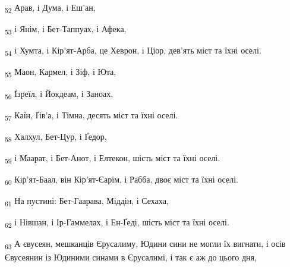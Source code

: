 \begin{tcolorbox}
\textsubscript{52} Арав, і Дума, і Еш'ан,
\end{tcolorbox}
\begin{tcolorbox}
\textsubscript{53} і Янім, і Бет-Таппуах, і Афека,
\end{tcolorbox}
\begin{tcolorbox}
\textsubscript{54} і Хумта, і Кір'ят-Арба, це Хеврон, і Ціор, дев'ять міст та їхні оселі.
\end{tcolorbox}
\begin{tcolorbox}
\textsubscript{55} Маон, Кармел, і Зіф, і Юта,
\end{tcolorbox}
\begin{tcolorbox}
\textsubscript{56} Їзреїл, і Йокдеам, і Заноах,
\end{tcolorbox}
\begin{tcolorbox}
\textsubscript{57} Каїн, Ґів'а, і Тімна, десять міст та їхні оселі.
\end{tcolorbox}
\begin{tcolorbox}
\textsubscript{58} Халхул, Бет-Цур, і Ґедор,
\end{tcolorbox}
\begin{tcolorbox}
\textsubscript{59} і Маарат, і Бет-Анот, і Елтекон, шість міст та їхні оселі.
\end{tcolorbox}
\begin{tcolorbox}
\textsubscript{60} Кір'ят-Баал, він Кір'ят-Єарім, і Рабба, двоє міст та їхні оселі.
\end{tcolorbox}
\begin{tcolorbox}
\textsubscript{61} На пустині: Бет-Гаарава, Міддін, і Сехаха,
\end{tcolorbox}
\begin{tcolorbox}
\textsubscript{62} і Нівшан, і Ір-Гаммелах, і Ен-Ґеді, шість міст та їхні оселі.
\end{tcolorbox}
\begin{tcolorbox}
\textsubscript{63} А євусеян, мешканців Єрусалиму, Юдини сини не могли їх вигнати, і осів Євусеянин із Юдиними синами в Єрусалимі, і так є аж до цього дня,
\end{tcolorbox}
